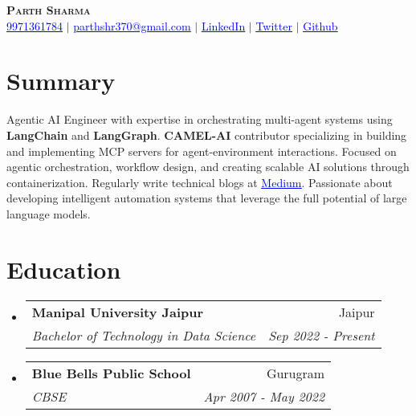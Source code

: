 \documentclass[letterpaper,11pt]{article}
\makeatletter
\newcommand{\resumeSubheading}[4]{
  \vspace{-2pt}\item
    \begin{tabular*}{0.97\textwidth}[t]{l@{\extracolsep{\fill}}r}
      \textbf{#1} & #2 \\
      \textit{\small#3} & \textit{\small #4} \\
    \end{tabular*}\vspace{-7pt}
}
\newcommand{\resumeSubHeadingListStart}{\begin{itemize}[leftmargin=0.15in, label={}]}
\newcommand{\resumeSubHeadingListEnd}{\end{itemize}}
\makeatother
\begin{document}

\begin{center}
    \textbf{\Huge \scshape Parth Sharma} \\ \vspace{1pt}
    \small \href{tel:9971361784}{\textcolor{blue}{\underline{9971361784}}} $|$ \href{mailto:parthshr370@gmail.com}{\textcolor{blue}{\underline{parthshr370@gmail.com}}} $|$
    \href{https://www.linkedin.com/in/parthshr370/}{\textcolor{blue}{\underline{LinkedIn}}} $|$
    \href{https://twitter.com/parthshr370/}{\textcolor{blue}{\underline{Twitter}}} $|$
    \href{https://github.com/parthshr370/}{\textcolor{blue}{\underline{Github}}}
\end{center}

\section{Summary}
\small{Agentic AI Engineer with expertise in orchestrating multi-agent systems using \textbf{LangChain} and \textbf{LangGraph}. \textbf{CAMEL-AI} contributor specializing in building and implementing MCP servers for agent-environment interactions. Focused on agentic orchestration, workflow design, and creating scalable AI solutions through containerization. Regularly write technical blogs at \href{https://medium.com/@parthshr370}{\textcolor{blue}{\underline{Medium}}}. Passionate about developing intelligent automation systems that leverage the full potential of large language models.}


\section{Education}
  \resumeSubHeadingListStart
    \resumeSubheading
      {Manipal University Jaipur}{Jaipur}
      {Bachelor of Technology in Data Science}{Sep 2022 - Present}
    \resumeSubheading
      {Blue Bells Public School}{Gurugram}
      {CBSE}{Apr 2007 - May 2022}
  \resumeSubHeadingListEnd
\end{document}
